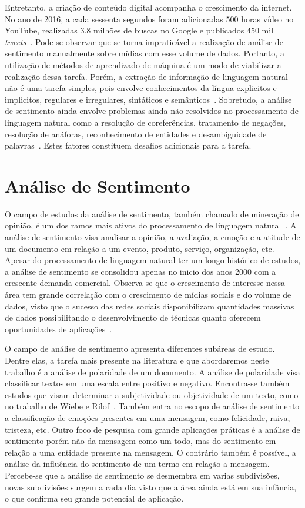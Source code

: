 Entretanto, a criação de conteúdo digital acompanha o crescimento da internet.
No ano de 2016, a cada sessenta segundos foram adicionadas 500 horas vídeo no YouTube, realizadas 3.8 milhões de buscas
no Google e publicados 450 mil \textit{tweets}~\cite{smartinsights}.
Pode-se observar que se torna impraticável a realização de análise de sentimento manualmente sobre mídias com esse volume
de dados.
Portanto, a utilização de métodos de aprendizado de máquina é um modo de viabilizar a realização dessa tarefa.
Porém, a extração de informação de linguagem natural não é uma tarefa simples, pois envolve conhecimentos da língua
explicitos e implicitos, regulares e irregulares, sintáticos e semânticos~\cite{cambria13}.
Sobretudo, a análise de sentimento ainda envolve problemas ainda não resolvidos no processamento de linguagem natural
como a resolução de coreferências, tratamento de negações, resolução de anáforas, reconhecimento de entidades e
desambiguidade de palavras~\cite{cambria13}.
Estes fatores constituem desafios adicionais para a tarefa.

\section{Análise de Sentimento}

O campo de estudos da análise de sentimento, também chamado de mineração de opinião, é um dos ramos mais ativos do
processamento de linguagem natural~\cite{liu12}.
A análise de sentimento visa analisar a opinião, a avaliação, a emoção e a atitude de um documento em relação a um
evento, produto, serviço, organização, etc.
Apesar do processamento de linguagem natural ter um longo histórico de estudos, a análise de sentimento se consolidou
apenas no inicio dos anos 2000 com a crescente demanda comercial.
Observa-se que o crescimento de interesse nessa área tem grande correlação com o crescimento de mídias sociais e do
volume de dados, visto que o sucesso das redes sociais disponibilizam quantidades massivas de dados possibilitando o
desenvolvimento de técnicas quanto oferecem oportunidades de aplicações~\cite{liu12}.

O campo de análise de sentimento apresenta diferentes subáreas de estudo.
Dentre elas, a tarefa mais presente na literatura e que abordaremos neste trabalho é a análise de polaridade de um
documento.
A análise de polaridade visa classificar textos em uma escala entre positivo e negativo.
Encontra-se também estudos que visam determinar a subjetividade ou objetividade de um texto, como no trabalho de Wiebe e
Rilof~\cite{Wiebe05}.
Também entra no escopo de análise de sentimento a classificação de emoções presentes em uma mensagem, como felicidade,
raiva, tristeza, etc.
Outro foco de pesquisa com grande aplicações práticas é a análise de sentimento porém não da mensagem como um todo, mas
do sentimento em relação a uma entidade presente na mensagem.
O contrário também é possível, a análise da influência do sentimento de um termo em relação a mensagem.
Percebe-se que a análise de sentimento se desmembra em varias subdivisões, novas subdivisões surgem a cada dia visto que
a área ainda está em sua infância, o que confirma seu grande potencial de aplicação.

